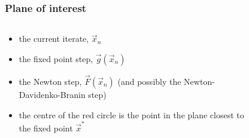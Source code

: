 \documentclass{beamer}
\begin{document}
\begin{frame}
\frametitle{Plane of interest}

\begin{columns}
	\begin{column}{0.5\textwidth}
		\begin{itemize}
			\item the current iterate, $\vec{x}_n$
			\item the fixed point step, $\vec{g}(\vec{x}_n)$
			\item the Newton step, $\vec{F}(\vec{x}_n)$ (and possibly the Newton-Davidenko-Branin step)
			\item the centre of the red circle is the point in the plane closest to the fixed point $\vec{x}^*$
		\end{itemize}
	\end{column}
	\begin{column}{0.5\textwidth}
		\begin{figure}
		\end{figure}
	\end{column}
\end{columns}

\end{frame}
\end{document}
